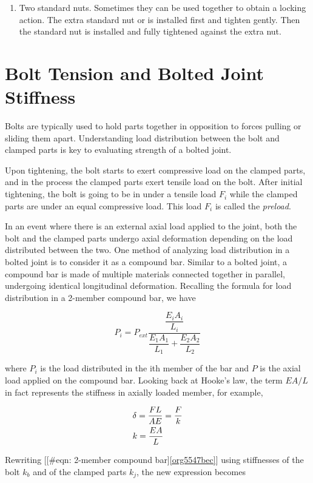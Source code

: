 \documentclass[a4paper,openany,12pt]{book}
\begin{document}
{{\begin{enumerate}
\item Two standard nuts. Sometimes they can be used together to obtain a
locking action. The extra standard nut or is installed first and
tighten gently. Then the standard nut is installed and fully
tightened against the extra nut.
\end{enumerate}

\section{Bolt Tension and Bolted Joint Stiffness}
\label{sec:orgb2d9843}
Bolts are typically used to hold parts together in opposition to forces
pulling or sliding them apart. Understanding load distribution between
the bolt and clamped parts is key to evaluating strength of a bolted
joint.

Upon tightening, the bolt starts to exert compressive load on the
clamped parts, and in the process the clamped parts exert tensile load
on the bolt. After initial tightening, the bolt is going to be in under
a tensile load \(F_i\) while the clamped parts are under an equal
compressive load. This load \(F_i\) is called the \emph{preload}.

In an event where there is an external axial load applied to the joint,
both the bolt and the clamped parts undergo axial deformation depending
on the load distributed between the two. One method of analyzing load
distribution in a bolted joint is to consider it as a compound bar.
Similar to a bolted joint, a compound bar is made of multiple materials
connected together in parallel, undergoing identical longitudinal
deformation. Recalling the formula for load distribution in a 2-member
compound bar, we have

$$ P_i = P_{ext}\frac{\dfrac{E_iA_i}{L_i}}{\dfrac{E_1A_1}{L_1} + \dfrac{E_2A_2}{L_2}}$$

where \(P_i\) is the load distributed in the ith member of the bar and \(P\)
is the axial load applied on the compound bar. Looking back at Hooke's
law, the term \(EA/L\) in fact represents the stiffness in axially loaded
member, for example,

$$\begin{gathered}
  \delta  = \frac{FL}{AE} = \frac{F}{k} \hfill \\
  k = \frac{EA}{L} \hfill \\ 
\end{gathered}$$

Rewriting [[\#eqn: 2-member compound bar]\ref{org5547bec}]
using stiffnesses of the bolt \(k_b\) and of the clamped parts \(k_j\), the
new expression becomes


}}
\end{document}
